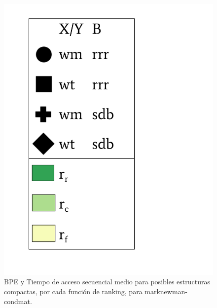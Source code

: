 \begin{frame}
\begin{figure}
\begin{minipage}{1\textwidth}
\begin{minipage}{0.15\textwidth}
    			\includegraphics[scale=.15, clip, trim=70 0 0 0]{../img/sdsl/label.pdf}
    		\end{minipage}	
    	\end{minipage}

	\caption{BPE y Tiempo de acceso secuencial medio para posibles estructuras compactas, por cada función de ranking, para marknewman-condmat.}
\end{figure}

\end{frame}

